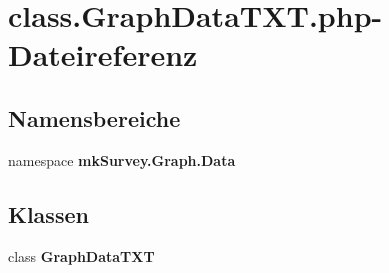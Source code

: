 \section{class.GraphDataTXT.php-Dateireferenz}
\label{class_8GraphDataTXT_8php}
\subsection*{Namensbereiche}
\begin{CompactItemize}
\item 
namespace {\bf mkSurvey.Graph.Data}
\end{CompactItemize}
\subsection*{Klassen}
\begin{CompactItemize}
\item 
class {\bf GraphDataTXT}
\end{CompactItemize}
